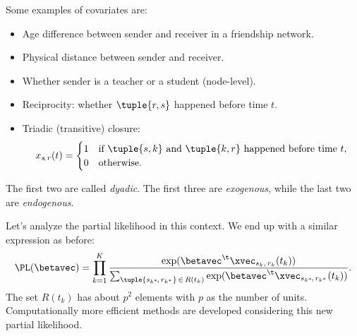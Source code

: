 \begin{examples}
    Some examples of covariates are:
    \begin{itemize}
        \item Age difference between sender and receiver in a friendship network.
        \item Physical distance between sender and receiver.
        \item Whether sender is a teacher or a student (node-level).
        \item Reciprocity: whether $\tuple{r, s}$ happened before time $t$.
        \item Triadic (transitive) closure:
              \begin{equation}
                  x_{s\negthinspace,\,r}(t) = \begin{cases}
                      1 & \text{if } \tuple{s, k} \text{ and } \tuple{k, r} \text{ happened before time } t, \\
                      0 & \text{otherwise}.
                  \end{cases}
              \end{equation}
    \end{itemize}
    The first two are called \emph{dyadic}. The first three are \emph{exogenous}, while the last two are \emph{endogenous}.
\end{examples}

Let's analyze the partial likelihood in this context. We end up with a similar expression as before:
\begin{equation}
    \PL(\betavec) = \prod_{k = 1}^K \frac{\exp(\betavec^\t\xvec_{s_k,\,r_k}(t_k))}{\sum_{\tuple{s_{k^*}\negthinspace,\,r_{k^*}}\,\in\,R(t_k)} \exp(\betavec^\t\xvec_{s_{k^*}\negthinspace,\,r_{k^*}}(t_k))}.
\end{equation}
The set $R(t_k)$ has about $p^2$ elements with $p$ as the number of units. Computationally more efficient methods are developed considering this new partial likelihood.